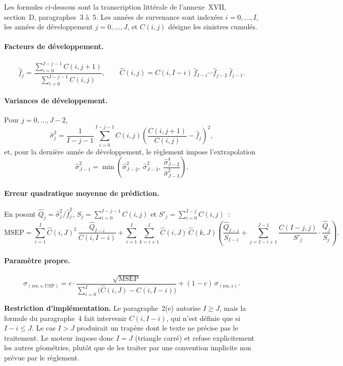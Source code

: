 \documentclass[a4paper,11pt]{article}
\begin{document}
Les formules ci-dessous sont la transcription littérale de l'annexe~XVII,
section~D, paragraphes~3 à~5. Les années de survenance sont indexées
$i = 0,\dots,I$, les années de développement $j = 0,\dots,J$, et $C(i,j)$ désigne
les sinistres cumulés.

\paragraph{Facteurs de développement.}
\[
  \hat f_j = \frac{\sum_{i=0}^{I-j-1} C(i,j+1)}{\sum_{i=0}^{I-j-1} C(i,j)},
  \qquad
  \hat C(i,j) = C(i,I-i)\,\hat f_{I-i}\cdots\hat f_{j-2}\,\hat f_{j-1}.
\]

\paragraph{Variances de développement.} Pour $j = 0,\dots,J-2$,
\[
  \hat\sigma_j^2 = \frac{1}{I-j-1}\sum_{i=0}^{I-j-1} C(i,j)
  \left(\frac{C(i,j+1)}{C(i,j)} - \hat f_j\right)^2,
\]
et, pour la dernière année de développement, le règlement impose l'extrapolation
\[
  \hat\sigma_{J-1}^2 = \min\!\left(\hat\sigma_{J-2}^2,\ \hat\sigma_{J-3}^2,\
  \frac{\hat\sigma_{J-2}^4}{\hat\sigma_{J-3}^2}\right).
\]

\paragraph{Erreur quadratique moyenne de prédiction.} En posant
$\hat Q_j = \hat\sigma_j^2/\hat f_j^2$,
$S_j = \sum_{i=0}^{I-j-1} C(i,j)$ et $S'_j = \sum_{i=0}^{I-j} C(i,j)$~:
\[
  \mathrm{MSEP} = \sum_{i=1}^{I}\hat C(i,J)^2\,\frac{\hat Q_{I-i}}{C(i,I-i)}
  + \sum_{i=1}^{I}\sum_{k=i+1}^{I}\hat C(i,J)\,\hat C(k,J)
  \left(\frac{\hat Q_{I-i}}{S_{I-i}}
  + \sum_{j=I-i+1}^{J-1}\frac{C(I-j,j)}{S'_j}\cdot\frac{\hat Q_j}{S_j}\right).
\]

\paragraph{Paramètre propre.}
\[
  \sigma_{(\text{res},s,\mathrm{USP})}
  = c\cdot\frac{\sqrt{\mathrm{MSEP}}}{\sum_{i=0}^{I}\big(\hat C(i,J) - C(i,I-i)\big)}
  + (1-c)\,\sigma_{(\text{res},s)} .
\]

\begin{encadre}
\textbf{Restriction d'implémentation.} Le paragraphe~2(e) autorise $I \ge J$, mais
la formule du paragraphe~4 fait intervenir $C(i, I-i)$, qui n'est définie que si
$I - i \le J$. Le cas $I > J$ produirait un trapèze dont le texte ne précise pas
le traitement. Le moteur impose donc $I = J$ (triangle carré) et refuse
explicitement les autres géométries, plutôt que de les traiter par une convention
implicite non prévue par le règlement.
\end{encadre}
\end{document}
